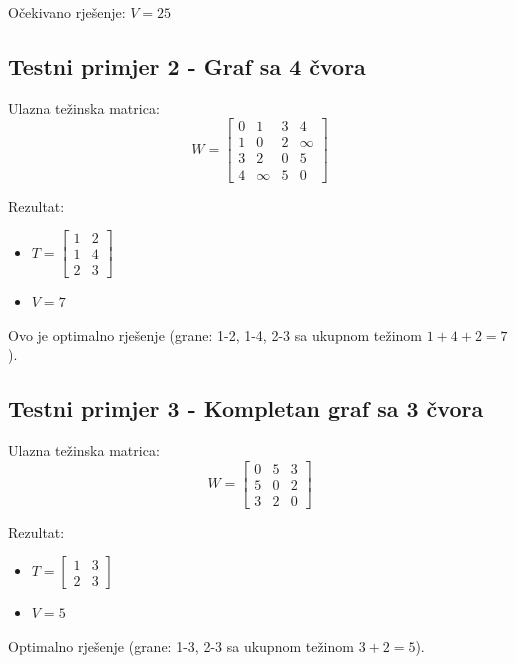 \documentclass[12pt,a4paper]{article}
\begin{document}
Očekivano rješenje: $V = 25$

\subsection{Testni primjer 2 - Graf sa 4 čvora}

Ulazna težinska matrica:
\begin{equation}
W = \begin{bmatrix}
0 & 1 & 3 & 4 \\
1 & 0 & 2 & \infty \\
3 & 2 & 0 & 5 \\
4 & \infty & 5 & 0
\end{bmatrix}
\end{equation}

Rezultat:
\begin{itemize}
\item $T = \begin{bmatrix} 1 & 2 \\ 1 & 4 \\ 2 & 3 \end{bmatrix}$
\item $V = 7$
\end{itemize}

Ovo je optimalno rješenje (grane: 1-2, 1-4, 2-3 sa ukupnom težinom $1 + 4 + 2 = 7$).

\subsection{Testni primjer 3 - Kompletan graf sa 3 čvora}

Ulazna težinska matrica:
\begin{equation}
W = \begin{bmatrix}
0 & 5 & 3 \\
5 & 0 & 2 \\
3 & 2 & 0
\end{bmatrix}
\end{equation}

Rezultat:
\begin{itemize}
\item $T = \begin{bmatrix} 1 & 3 \\ 2 & 3 \end{bmatrix}$
\item $V = 5$
\end{itemize}

Optimalno rješenje (grane: 1-3, 2-3 sa ukupnom težinom $3 + 2 = 5$).
\end{document}
